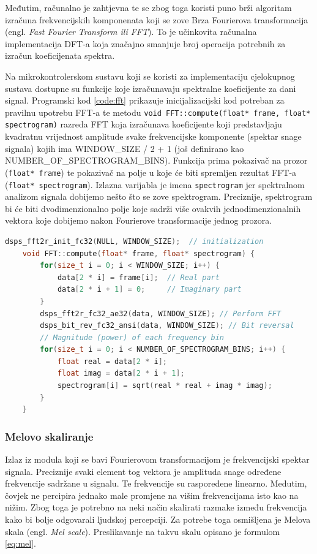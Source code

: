 Međutim, računalno je zahtjevna te se zbog toga koristi puno brži algoritam izračuna
frekvencijskih komponenata koji se zove Brza Fourierova transformacija (engl. \textit{Fast Fourier
Transform ili FFT}). To je učinkovita računalna implementacija DFT-a koja značajno smanjuje
broj operacija potrebnih za izračun koeficijenata spektra.

Na mikrokontrolerskom sustavu koji se koristi za implementaciju cjelokupnog sustava
dostupne su funkcije koje izračunavaju spektralne koeficijente za dani signal. 
Programski kod \ref{code:fft} prikazuje inicijalizacijski kod potreban za pravilnu 
upotrebu FFT-a te metodu \texttt{void FFT::compute(float* frame, float* spectrogram)} 
razreda FFT koja izračunava koeficijente koji predstavljaju kvadratnu vrijednost
amplitude svake frekvencijske komponente (spektar snage signala) kojih ima 
WINDOW\_SIZE / 2 + 1 (još definirano kao NUMBER\_OF\_SPECTROGRAM\_BINS). 
Funkcija prima pokazivač na prozor (\texttt{float* frame}) te pokazivač na polje
u koje će biti spremljen rezultat FFT-a (\texttt{float* spectrogram}). Izlazna
varijabla je imena \texttt{spectrogram} jer spektralnom analizom signala dobijemo
nešto što se zove spektrogram. Preciznije, spektrogram bi će biti dvodimenzionalno
polje koje sadrži više ovakvih jednodimenzionalnih vektora koje dobijemo nakon
Fourierove transformacije jednog prozora. 

\begin{lstlisting}[language=C++, caption=FFT, label=code:fft]
    dsps_fft2r_init_fc32(NULL, WINDOW_SIZE);  // initialization 
    void FFT::compute(float* frame, float* spectrogram) {
        for(size_t i = 0; i < WINDOW_SIZE; i++) {
            data[2 * i] = frame[i];  // Real part
            data[2 * i + 1] = 0;     // Imaginary part
        }
        dsps_fft2r_fc32_ae32(data, WINDOW_SIZE); // Perform FFT
        dsps_bit_rev_fc32_ansi(data, WINDOW_SIZE); // Bit reversal
        // Magnitude (power) of each frequency bin
        for(size_t i = 0; i < NUMBER_OF_SPECTROGRAM_BINS; i++) {
            float real = data[2 * i];
            float imag = data[2 * i + 1];
            spectrogram[i] = sqrt(real * real + imag * imag);
        }
    }
\end{lstlisting}


\subsubsection{Melovo skaliranje}
\label{sec:mel}
Izlaz iz modula koji se bavi Fourierovom transformacijom je frekvencijski spektar signala.
Preciznije svaki element tog vektora je amplituda snage određene frekvencije sadržane u signalu.
Te frekvencije su raspoređene linearno. Međutim, čovjek ne percipira jednako male promjene 
na višim frekvencijama isto kao na nižim. Zbog toga je potrebno na neki način skalirati
razmake između frekvencija kako bi bolje odgovarali ljudskoj percepciji. Za potrebe toga
osmišljena je Melova skala (engl. \textit{Mel scale}). Preslikavanje na takvu skalu opisano je formulom
\ref{eq:mel}.

